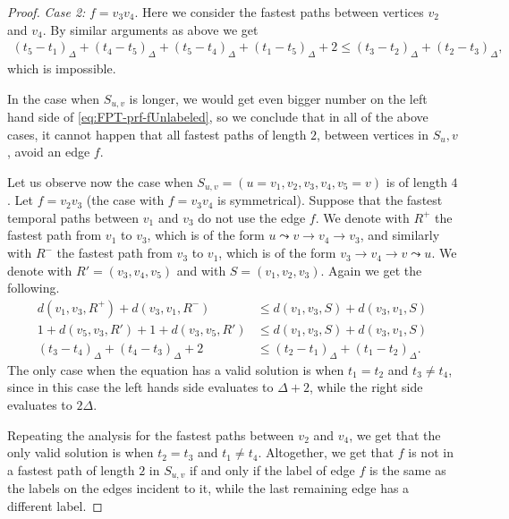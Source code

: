 \documentclass[a4paper,UKenglish,cleveref, autoref, thm-restate, anonymous]{lipics-v2021}
\begin{document}
\begin{proof}
    \emph{Case 2: }$f = v_3v_4$.
    Here we consider the fastest paths between vertices $v_{2}$ and $v_{4}$.
    By similar arguments as above we get
    \begin{align*}
        (t_5 - t_1)_\Delta + (t_4 - t_5)_\Delta + (t_5 - t_4)_\Delta + (t_1 - t_5)_\Delta + 2 \leq (t_3 - t_2)_\Delta + (t_2 - t_3)_\Delta,
    \end{align*}
    which is impossible.
    
    In the case when $S_{u,v}$ is longer, we would get even bigger number on the left hand side of \cref{eq:FPT-prf-fUnlabeled}, 
    so we conclude that in all of the above cases, it cannot happen that all fastest paths of length $2$, between vertices in $S{_u,v}$, avoid an edge $f$.

    Let us observe now the case when $S_{u,v} = (u=v_1,v_2, v_3, v_4, v_5=v)$ is of length $4$.
    Let $f = v_2 v_3$ (the case with $f = v_3 v_4$ is symmetrical).
    Suppose that the fastest temporal paths between $v_1$ and $v_3$ do not use the edge $f$.
    We denote with $R^+$ the fastest path from $v_1$ to $v_3$, 
    which is of the form $u \leadsto v \rightarrow v_4 \rightarrow v_3$,
    and similarly 
    with $R^-$ the fastest path from $v_3$ to $v_1$, which is
    of the form $v_3 \rightarrow v_4 \rightarrow v \leadsto u$.
    We denote with $R' = (v_3, v_4, v_5)$ and with $S = (v_1,v_2,v_3)$.
    Again we get the following.
    \begin{equation*}
    \begin{split}
        d(v_{1}, v_{3}, R^+) + d(v_{3}, v_{1}, R^-) &\leq 
        d(v_{1}, v_{3}, S) + d(v_{3}, v_{1}, S) \\
        1 + d(v_5,v_3,R') + 1 + d(v_3,v_5,R') &\leq d(v_{1}, v_{3}, S) + d(v_{3}, v_{1}, S) \\
        (t_3 - t_4)_\Delta + (t_4 - t_3)_\Delta + 2 
        &\leq 
        (t_2 - t_1)_\Delta + (t_1 - t_2)_\Delta.        
    \end{split}
    \end{equation*}
    The only case when the equation has a valid solution is when $t_1 = t_2$ and $t_3 \neq t_4$,
    since in this case the left hands side evaluates to $\Delta + 2$, while the right side evaluates to $2 \Delta$.
    
    Repeating the analysis for the fastest paths between $v_2$ and $v_4$,
    we get that the only valid solution is when $t_2 = t_3$ and $t_1 \neq t_4$.
    Altogether, we get that $f$ is not in a fastest path of length $2$ in $S_{u,v}$ if and only if the label of edge $f$ is the same as the labels on the edges incident to it, while the last remaining edge has a different label.
\end{proof}
\end{document}
